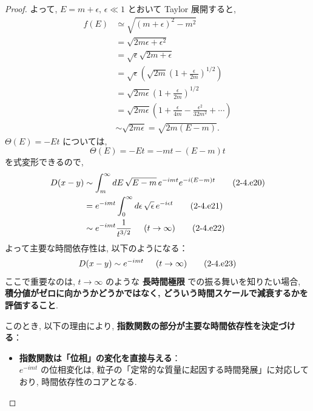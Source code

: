 \documentclass[a4paper,12pt]{article}
\begin{document}
\begin{proof}
よって, $E = m + \epsilon,\, \epsilon \ll 1$ とおいて Taylor 展開すると,
\begin{align*}
  f(E) &\simeq \sqrt{(m + \epsilon)^2 - m^2} \tag{2-4.e12}\\
  &= \sqrt{2m\epsilon + \epsilon^2} \tag{2-4.e13}\\
  &= \sqrt{\epsilon} \sqrt{2m + \epsilon} \tag{2-4.e14}\\
  &= \sqrt{\epsilon} \left( \sqrt{2m} \left( 1 + \frac{\epsilon}{2m} \right)^{1/2} \right) \tag{2-4.e15}\\
  &= \sqrt{2m\epsilon} \left( 1 + \frac{\epsilon}{2m} \right)^{1/2} \tag{2-4.e16}\\
  &= \sqrt{2m\epsilon} \left( 1 + \frac{\epsilon}{4m} - \frac{\epsilon^2}{32m^2} + \cdots \right) \tag{2-4.e17}\\
  &\sim \sqrt{2m\epsilon} = \sqrt{2m(E - m)}. \tag{2-4.e18}
\end{align*}
$\Theta(E) = -E t$ については,
\begin{equation*}
  \Theta(E) = -E t = -mt - (E - m)t \tag{2-4.e19}
\end{equation*}
を式変形できるので,
\begin{align*}
  D(x-y) &\sim \int_{m}^{\infty} dE\, \sqrt{E - m}\, e^{-imt} e^{-i(E - m)t} \tag{2-4.e20}\\
  &= e^{-imt} \int_{0}^{\infty} d\epsilon\, \sqrt{\epsilon}\,  e^{-i\epsilon t} \label{2-4.e21}\tag{2-4.e21}\\
  &\sim e^{-imt} \frac{1}{t^{3/2}} \hspace{0.5cm} (t \to \infty) \label{2-4.e22}\tag{2-4.e22}
\end{align*}
よって主要な時間依存性は, 以下のようになる：
\begin{equation*}
  D(x-y) \sim e^{-imt} \hspace{0.5cm} (t \to \infty) \tag{2-4.e23}
\end{equation*}
ここで重要なのは, $t \to \infty$ のような \textbf{長時間極限} での振る舞いを知りたい場合, \textbf{積分値がゼロに向かうかどうかではなく, どういう時間スケールで減衰するかを評価すること}.

このとき, 以下の理由により, \textbf{指数関数の部分が主要な時間依存性を決定づける}：

\begin{itemize}
  \item \textbf{指数関数は「位相」の変化を直接与える}：\\
  $e^{-imt}$ の位相変化は, 粒子の「定常的な質量に起因する時間発展」に対応しており, 時間依存性のコアとなる.


\end{itemize}
\end{proof}
\end{document}
